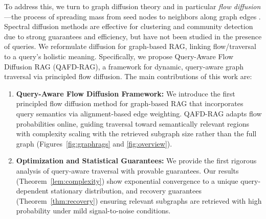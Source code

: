 \documentclass{article} %
\begin{document}
To address this, we turn to graph diffusion theory and in particular \textit{flow diffusion}—the process of spreading mass from seed nodes to neighbors along graph edges \citep{lovasz1993random,chung1997spectral,fortunato2010community,spielman2013local, fountoulakis2023flow}. Spectral diffusion methods are effective for clustering and community detection due to strong guarantees and efficiency, but have not been studied in the presence of queries. We reformulate diffusion for graph-based RAG, linking flow/traversal to a query’s holistic meaning. Specifically, we propose Query-Aware Flow Diffusion RAG (QAFD-RAG), a framework for dynamic, query-aware graph traversal via principled flow diffusion. The main contributions of this work are:
\begin{enumerate}[wide, labelindent=3pt, itemsep=0pt, label=\textbf{C\arabic*.}]
\vspace{-.1cm}
\item \textbf{Query-Aware Flow Diffusion Framework:} We introduce the first principled flow diffusion method for graph-based RAG that incorporates query semantics via alignment-based edge weighting. QAFD-RAG adapts flow probabilities online, guiding traversal toward semantically relevant regions with complexity scaling with the retrieved subgraph size rather than the full graph (Figures~\ref{fig:graphrags} and \ref{fig:overview}).
\item \textbf{Optimization and Statistical Guarantees:} We provide the first rigorous analysis of query-aware traversal with provable guarantees. Our results (Theorem~\ref{lem:complexity}) show exponential convergence to a unique query-dependent stationary distribution, and recovery guarantees (Theorem~\ref{thm:recovery}) ensuring relevant subgraphs are retrieved with high probability under mild signal-to-noise conditions.

\end{enumerate}
\end{document}
